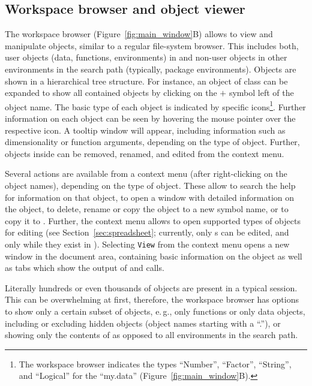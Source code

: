 \subsection{Workspace browser and object viewer}
\label{sec:workspace_browser_object_viewer}

The workspace browser (Figure~\ref{fig:main_window}B) allows to view
and manipulate  objects, similar
to a regular file-system browser. This includes both, user objects
(data, functions, environments) in  and non-user objects in other environments in the
 search path (typically,
 package environments). Objects are shown
in a hierarchical tree structure. For instance, an object of class
 can be expanded to show all contained objects 
by clicking on the $+$ symbol left of the object name.
The basic type of each object is indicated by specific icons\footnote{The workspace browser 
indicates the types ``Number'', ``Factor'', ``String'', and ``Logical'' for the  
``my.data'' (Figure~\ref{fig:main_window}B).}. 
Further information on each object can be seen by hovering the mouse
pointer over the respective icon. A tooltip window will appear,
including information such as dimensionality or function arguments,
depending on the type of object. Further, objects inside  can be
removed, renamed, and edited from the context menu.

Several actions are available from a context menu (after right-clicking
on the object names), depending on the type of object. These allow to search the
 help for information on that object, to
open a window with detailed information on the object, to delete, rename or copy the object to a new symbol name, or to
copy it to . Further, the context menu allows to open
supported types of objects for editing (see Section~\ref{sec:spreadsheet}; currently, only
s can be edited, and only while they exist in ). 
Selecting \texttt{View} from the 
context menu opens a new window in the
document area, containing basic information on the object as well as 
tabs which show the output of
 and  calls.

Literally hundreds or even thousands of objects are present in a typical
 session. This can be overwhelming at
first, therefore, the workspace browser has options to show only a certain
subset of objects, e.\,g., only functions or only data objects, including
or excluding hidden objects (object names starting with a 
``.''), or showing only the contents of  as
opposed to all environments in the search path.

